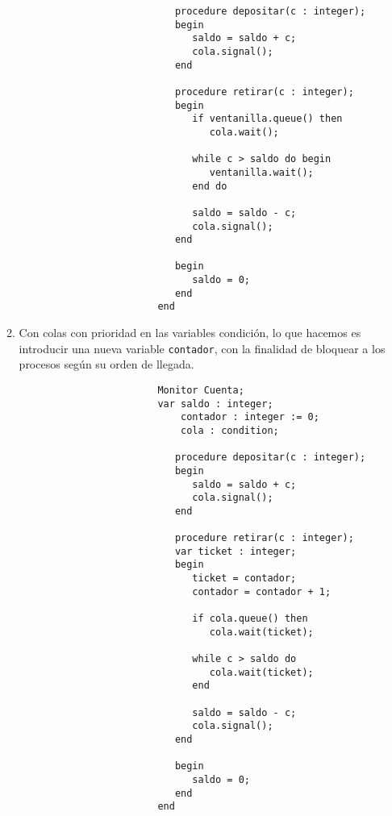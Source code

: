 \begin{ejercicio}
\begin{enumerate}
\begin{enumerate}[label=\alph*)]
\begin{verbatim}
                           procedure depositar(c : integer);
                           begin
                              saldo = saldo + c;
                              cola.signal();
                           end

                           procedure retirar(c : integer);
                           begin
                              if ventanilla.queue() then
                                 cola.wait();

                              while c > saldo do begin
                                 ventanilla.wait();
                              end do

                              saldo = saldo - c;
                              cola.signal();
                           end

                           begin
                              saldo = 0;
                           end
                        end
                    \end{verbatim}
                \item Con colas con prioridad en las variables condición, lo que hacemos es introducir una nueva variable \verb|contador|, con la finalidad de bloquear a los procesos según su orden de llegada.
                    \begin{verbatim}
                        Monitor Cuenta;
                        var saldo : integer;
                            contador : integer := 0;
                            cola : condition;

                           procedure depositar(c : integer);
                           begin
                              saldo = saldo + c;
                              cola.signal();
                           end

                           procedure retirar(c : integer);
                           var ticket : integer;
                           begin
                              ticket = contador;
                              contador = contador + 1;

                              if cola.queue() then 
                                 cola.wait(ticket);

                              while c > saldo do
                                 cola.wait(ticket);
                              end

                              saldo = saldo - c;
                              cola.signal();
                           end

                           begin
                              saldo = 0;
                           end
                        end
                    \end{verbatim}
            \end{enumerate}
    \end{enumerate}
\end{ejercicio}

